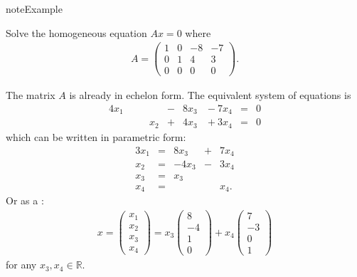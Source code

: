 \documentclass[letterpaper,10pt,english]{jupyterBook}
\begin{document}
\begin{sphinxadmonition}{note}{Example}

\sphinxAtStartPar
Solve the homogeneous equation \(Ax=0\) where
\begin{equation*}
\begin{split}A = \begin{pmatrix}1 & 0 & -8 & -7\\
0 & 1 & 4 & 3\\
 0 & 0 & 0 & 0\end{pmatrix}.\end{split}
\end{equation*}
\sphinxAtStartPar
{}

\sphinxAtStartPar
The matrix \(A\) is already in echelon form. The equivalent system of equations is
\begin{alignat*}{4}
 x_1 & \quad & & {}-{} & 8x_3 & {}-{} 7x_4 & {}={} & 0\\
& \quad & x_2 & {}+{} & 4x_3 & {}+{} 3x_4 & {}={} & 0
 \end{alignat*}
\sphinxAtStartPar
which can be written in parametric form:
\begin{alignat*}{3}
 x_1 & {}={} & 8x_3 & {}+{} & 7x_4\\
x_2 & {}={} & -4x_3 & {}-{} & 3x_4\\
  x_3 & {}={} & x_3 & &\\
 x_4 & {}={} & & & x_4.
 \end{alignat*}
\sphinxAtStartPar
Or as a :
\begin{equation*}
\begin{split}x = \begin{pmatrix}x_1\\x_2\\x_3\\x_4\end{pmatrix}
 = x_3\begin{pmatrix}8\\-4\\1\\0\end{pmatrix}
 + x_4\begin{pmatrix}7\\-3\\0\\1\end{pmatrix}\end{split}
\end{equation*}
\sphinxAtStartPar
for any \(x_3, x_4 \in \mathbb{R}\).


\end{sphinxadmonition}
\end{document}
